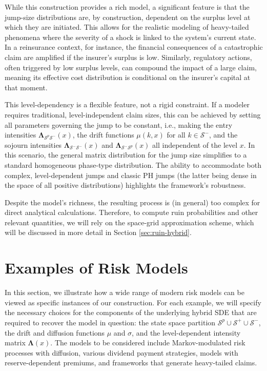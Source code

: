 \documentclass[11pt]{article}
\numberwithin{table}{section}
\numberwithin{figure}{section}
\numberwithin{equation}{section}
\newcommand{\1}{{\mathbf 1}}
\newcommand{\0}{\mat{0}}
\begin{document}
While this construction provides a rich model, a significant feature is that the jump-size distributions are, by construction, dependent on the surplus level at which they are initiated. This allows for the realistic modeling of heavy-tailed phenomena where the
severity of a shock is linked to the system’s current state. {In a reinsurance context, for instance, the financial consequences of a catastrophic claim are amplified if the insurer's surplus is low. Similarly, regulatory actions, often triggered by low surplus levels, can compound the impact of a large claim, meaning its effective cost distribution is conditional on the insurer's capital at that moment.}


This level-dependency is a flexible feature, not a rigid constraint. If a modeler requires traditional, level-independent claim sizes, this can be achieved by setting all parameters governing the jump to be constant, i.e., making the entry intensities \(\bm{\Lambda}_{\mathcal{S}^p\mathcal{S}^-}(x)\), the drift functions \(\mu(k,x)\) for all \(k \in \mathcal{S}^-\), and the sojourn intensities \(\bm{\Lambda}_{\mathcal{S}^-\mathcal{S}^-}(x)\) and \(\bm{\Lambda}_{\mathcal{S}^-\mathcal{S}^p}(x)\) all independent of the level \(x\). In this scenario, the general matrix distribution for the jump size simplifies to a standard homogeneous phase-type distribution. The ability to accommodate both complex, level-dependent jumps and classic PH jumps (the latter being dense in the space of all positive distributions) highlights the framework's robustness.

Despite the model's richness, the resulting process is (in general) too complex for direct analytical calculations. Therefore, to compute ruin probabilities and other relevant quantities, we will rely on the space-grid approximation scheme, which will be discussed in more detail in Section \ref{sec:ruin-hybrid}.


\section{Examples of Risk Models}\label{sec:model-examples}

In this section, we illustrate how a wide range of modern risk models can be viewed as specific instances of our construction. For each example, we will specify the necessary choices for the components of the underlying hybrid SDE that are required to recover the model in question: the state space partition $\mathcal{S}^p \cup \mathcal{S}^+ \cup \mathcal{S}^-$, the drift and diffusion functions $\mu$ and $\sigma$, and the level-dependent intensity matrix $\bm{\Lambda}(x)$. The models to be considered include Markov-modulated risk processes with diffusion, various dividend payment strategies, models with reserve-dependent premiums, and frameworks that generate heavy-tailed claims.
\end{document}
